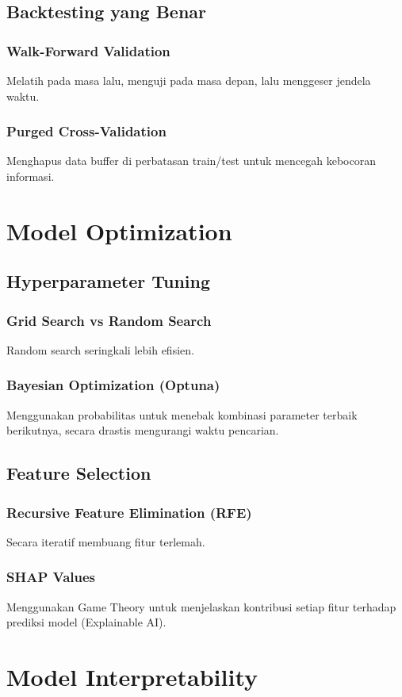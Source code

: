 \documentclass[12pt,a4paper]{book}
\begin{document}
\section{Backtesting yang Benar}
\subsection{Walk-Forward Validation}
Melatih pada masa lalu, menguji pada masa depan, lalu menggeser jendela waktu.
\subsection{Purged Cross-Validation}
Menghapus data buffer di perbatasan train/test untuk mencegah kebocoran informasi.

\chapter{Model Optimization}
\section{Hyperparameter Tuning}
\subsection{Grid Search vs Random Search}
Random search seringkali lebih efisien.
\subsection{Bayesian Optimization (Optuna)}
Menggunakan probabilitas untuk menebak kombinasi parameter terbaik berikutnya, secara drastis mengurangi waktu pencarian.

\section{Feature Selection}
\subsection{Recursive Feature Elimination (RFE)}
Secara iteratif membuang fitur terlemah.
\subsection{SHAP Values}
Menggunakan Game Theory untuk menjelaskan kontribusi setiap fitur terhadap prediksi model (Explainable AI).

\chapter{Model Interpretability}
\end{document}
